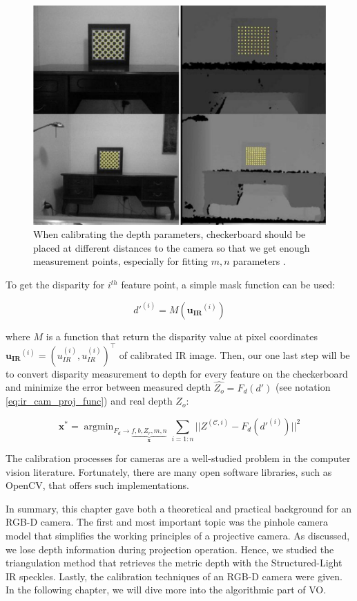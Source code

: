 \documentclass[12pt]{report}
\numberwithin{figure}{section}
\newcommand{\argmin}{\mathop{\mathrm{argmin}}}
\begin{document}
\begin{figure}[H]
	\centering
  \includegraphics[width=0.7\linewidth,natwidth=640,natheight=640]
  {fig/ref_imgs/checkerboard_depth.png}
  \caption[Checkboard Calibration for Depth]{When calibrating the depth 
  parameters, checkerboard should be placed at different distances to the 
  camera so that we get enough measurement points, especially for fitting 
  $m,n$ parameters \parencite{Karan2015}.}
  \label{fig:checkerboard_depth}
\end{figure}

To get the disparity for $i^{th}$ feature point, a simple mask function can be 
used:

\begin{equation}
  d'^{(i)} = M(\mathbf{u_{IR}}^{(i)})
\end{equation}

where $M$ is a function that return the disparity value at pixel coordinates 
$\mathbf{u_{IR}}^{(i)}=(u_{IR}^{(i)},u_{IR}^{(i)})^\top$ of calibrated IR 
image.  
Then, our one last step will be to convert disparity measurement to depth for 
every feature on the checkerboard and minimize the error between measured 
depth 
$\hat{Z_o}=F_d(d')$ (see notation \eqref{eq:ir_cam_proj_func}) and 
real depth 
$Z_o$:

\begin{equation}\label{eq:proj_lsq}
  \mathbf{x^*} = 
  \argmin_{F_d \rightarrow \underbrace{f, b, Z_r, m, n}_{\mathbf{x}}}
  \sum_{i=1:n} || Z^{(\mathcal{C}, i)} - F_d(d'^{(i)})  ||^2
\end{equation}

The calibration processes for cameras are a well-studied problem in the 
computer 
vision literature.  Fortunately, there are many open software libraries, such 
as OpenCV, that offers such implementations.

In summary, this chapter gave both a theoretical and practical background 
for an RGB-D camera. The first and most important topic was the pinhole 
camera model that simplifies the working principles of a projective camera. 
As discussed, we lose depth information during projection operation. Hence, 
we studied the triangulation method that retrieves the metric depth 
with the Structured-Light IR speckles. Lastly, the calibration techniques of 
an RGB-D camera were given. In the following chapter, we will dive more 
into the algorithmic part of VO.
\end{document}

